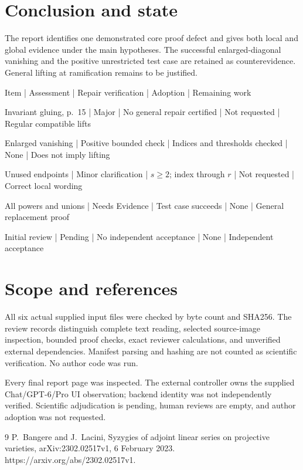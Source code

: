 \documentclass[10pt]{article}
\begin{document}
\section*{Conclusion and state}
The report identifies one demonstrated core proof defect and gives both local and global evidence under the main hypotheses. The successful enlarged-diagonal vanishing and the positive unrestricted test case are retained as counterevidence. General lifting at ramification remains to be justified.\par
Item | Assessment | Repair verification | Adoption | Remaining work\par
Invariant gluing, p. 15 | Major | No general repair certified | Not requested | Regular compatible lifts\par
Enlarged vanishing | Positive bounded check | Indices and thresholds checked | None | Does not imply lifting\par
Unused endpoints | Minor clarification | \(s\ge2\); index through \(r\) | Not requested | Correct local wording\par
All powers and unions | Needs Evidence | Test case succeeds | None | General replacement proof\par
Initial review | Pending | No independent acceptance | None | Independent acceptance\par
\section*{Scope and references}
All six actual supplied input files were checked by byte count and SHA256. The review records distinguish complete text reading, selected source-image inspection, bounded proof checks, exact reviewer calculations, and unverified external dependencies. Manifest parsing and hashing are not counted as scientific verification. No author code was run.\par
Every final report page was inspected. The external controller owns the supplied Chat/GPT-6/Pro UI observation; backend identity was not independently verified. Scientific adjudication is pending, human reviews are empty, and author adoption was not requested.\par
9 P. Bangere and J. Lacini, Syzygies of adjoint linear series on projective varieties, arXiv:2302.02517v1, 6 February 2023. https://arxiv.org/abs/2302.02517v1.\par
\end{document}
